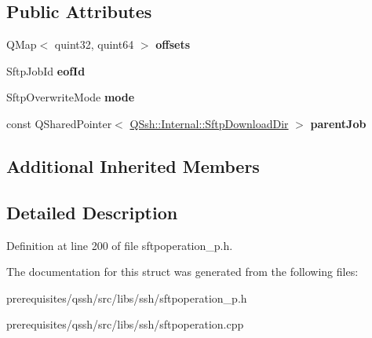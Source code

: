 \subsection*{Public Attributes}
\begin{DoxyCompactItemize}
\item 
\mbox{\label{struct_q_ssh_1_1_internal_1_1_sftp_download_a8088b5d2dd9fda17b1f87b964813a891}} 
Q\+Map$<$ quint32, quint64 $>$ {\bfseries offsets}
\item 
\mbox{\label{struct_q_ssh_1_1_internal_1_1_sftp_download_a703f10bc006912871ca1a99fa8fb109a}} 
Sftp\+Job\+Id {\bfseries eof\+Id}
\item 
\mbox{\label{struct_q_ssh_1_1_internal_1_1_sftp_download_a0a4b39636492a4daeb50ab0091327056}} 
Sftp\+Overwrite\+Mode {\bfseries mode}
\item 
\mbox{\label{struct_q_ssh_1_1_internal_1_1_sftp_download_aa1e974d9e4bb83560e8d1269aa789eb2}} 
const Q\+Shared\+Pointer$<$ \mbox{\hyperlink{struct_q_ssh_1_1_internal_1_1_sftp_download_dir}{Q\+Ssh\+::\+Internal\+::\+Sftp\+Download\+Dir}} $>$ {\bfseries parent\+Job}
\end{DoxyCompactItemize}
\subsection*{Additional Inherited Members}


\subsection{Detailed Description}


Definition at line 200 of file sftpoperation\+\_\+p.\+h.



The documentation for this struct was generated from the following files\+:\begin{DoxyCompactItemize}
\item 
prerequisites/qssh/src/libs/ssh/sftpoperation\+\_\+p.\+h\item 
prerequisites/qssh/src/libs/ssh/sftpoperation.\+cpp\end{DoxyCompactItemize}

